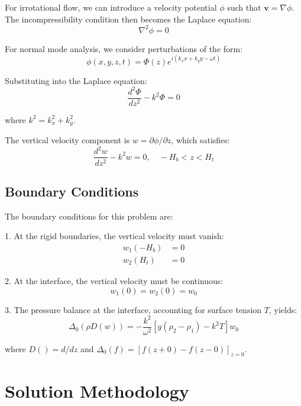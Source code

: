 \documentclass[12pt,a4paper]{article}
\begin{document}
For irrotational flow, we can introduce a velocity potential $\phi$ such that $\mathbf{v} = \nabla \phi$. The incompressibility condition then becomes the Laplace equation:
\begin{equation}
\nabla^2 \phi = 0
\end{equation}

For normal mode analysis, we consider perturbations of the form:
\begin{equation}
\phi(x,y,z,t) = \Phi(z)e^{i(k_x x + k_y y - \omega t)}
\end{equation}

Substituting into the Laplace equation:
\begin{equation}
\frac{d^2\Phi}{dz^2} - k^2\Phi = 0
\end{equation}

where $k^2 = k_x^2 + k_y^2$.

The vertical velocity component is $w = \partial\phi/\partial z$, which satisfies:
\begin{equation}
\frac{d^2 w}{dz^2} - k^2 w = 0, \quad -H_b < z < H_t
\end{equation}

\subsection{Boundary Conditions}
The boundary conditions for this problem are:

1. At the rigid boundaries, the vertical velocity must vanish:
\begin{align}
w_1(-H_b) &= 0 \\
w_2(H_t) &= 0
\end{align}

2. At the interface, the vertical velocity must be continuous:
\begin{equation}
w_1(0) = w_2(0) = w_0
\end{equation}

3. The pressure balance at the interface, accounting for surface tension $T$, yields:
\begin{equation}
\Delta_0(\rho D(w)) = -\frac{k^2}{\omega^2}[g(\rho_2 - \rho_1) - k^2T]w_0
\end{equation}

where $D() = d/dz$ and $\Delta_0(f) = [f(z+0) - f(z-0)]_{z=0}$.

\section{Solution Methodology}
\end{document}
